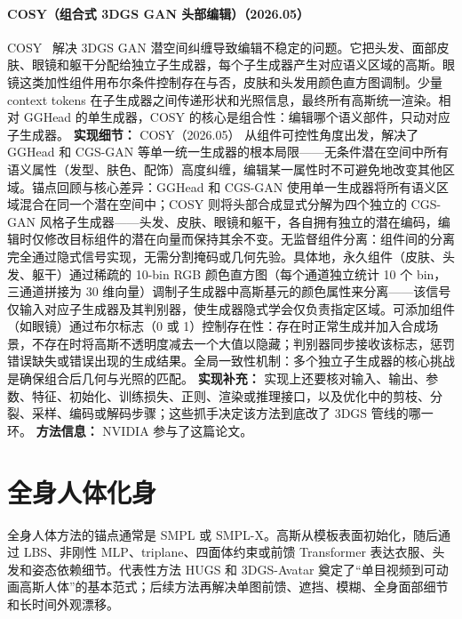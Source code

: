 \paragraph{COSY（组合式 3DGS GAN 头部编辑）（2026.05）}
COSY~\cite{2605_24114} 解决 3DGS GAN 潜空间纠缠导致编辑不稳定的问题。它把头发、面部皮肤、眼镜和躯干分配给独立子生成器，每个子生成器产生对应语义区域的高斯。眼镜这类加性组件用布尔条件控制存在与否，皮肤和头发用颜色直方图调制。少量 context tokens 在子生成器之间传递形状和光照信息，最终所有高斯统一渲染。相对 GGHead 的单生成器，COSY 的核心是组合性：编辑哪个语义部件，只动对应子生成器。
\textbf{实现细节：} COSY（2026.05） 从组件可控性角度出发，解决了 GGHead 和 CGS-GAN 等单一统一生成器的根本局限——无条件潜在空间中所有语义属性（发型、肤色、配饰）高度纠缠，编辑某一属性时不可避免地改变其他区域。锚点回顾与核心差异：GGHead 和 CGS-GAN 使用单一生成器将所有语义区域混合在同一个潜在空间中；COSY 则将头部合成显式分解为四个独立的 CGS-GAN 风格子生成器——头发、皮肤、眼镜和躯干，各自拥有独立的潜在编码，编辑时仅修改目标组件的潜在向量而保持其余不变。无监督组件分离：组件间的分离完全通过隐式信号实现，无需分割掩码或几何先验。具体地，永久组件（皮肤、头发、躯干）通过稀疏的 10-bin RGB 颜色直方图（每个通道独立统计 10 个 bin，三通道拼接为 30 维向量）调制子生成器中高斯基元的颜色属性来分离——该信号仅输入对应子生成器及其判别器，使生成器隐式学会仅负责指定区域。可添加组件（如眼镜）通过布尔标志（0 或 1）控制存在性：存在时正常生成并加入合成场景，不存在时将高斯不透明度减去一个大值以隐藏；判别器同步接收该标志，惩罚错误缺失或错误出现的生成结果。全局一致性机制：多个独立子生成器的核心挑战是确保组合后几何与光照的匹配。
\textbf{实现补充：} 实现上还要核对输入、输出、参数、特征、初始化、训练损失、正则、渲染或推理接口，以及优化中的剪枝、分裂、采样、编码或解码步骤；这些抓手决定该方法到底改了 3DGS 管线的哪一环。
\textbf{方法信息：} NVIDIA 参与了这篇论文。



\section{全身人体化身}

全身人体方法的锚点通常是 SMPL 或 SMPL-X。高斯从模板表面初始化，随后通过 LBS、非刚性 MLP、triplane、四面体约束或前馈 Transformer 表达衣服、头发和姿态依赖细节。代表性方法 HUGS 和 3DGS-Avatar 奠定了“单目视频到可动画高斯人体”的基本范式；后续方法再解决单图前馈、遮挡、模糊、全身面部细节和长时间外观漂移。


